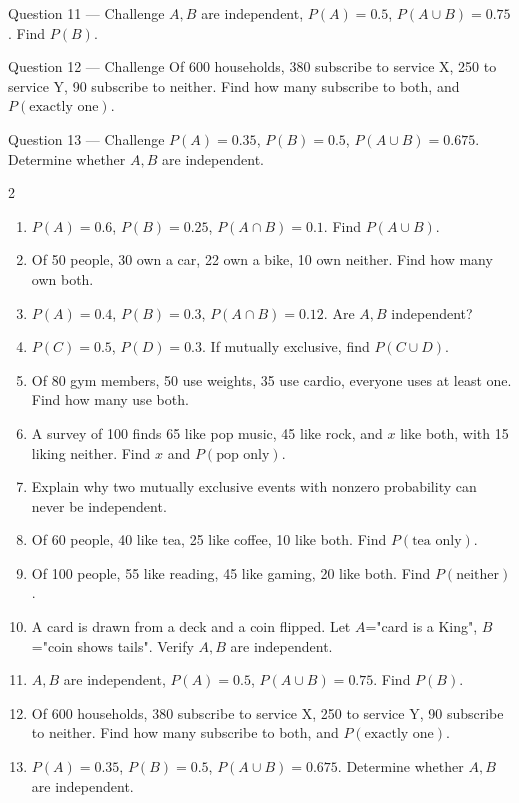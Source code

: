 \documentclass[11pt]{article}
\begin{document}
\begin{qbox}{Question 11 --- Challenge}
$A,B$ are independent, $P(A)=0.5$, $P(A\cup B)=0.75$. Find $P(B)$.\workspace{3.2cm}
\end{qbox}

\begin{qbox}{Question 12 --- Challenge}
Of 600 households, 380 subscribe to service X, 250 to service Y, 90 subscribe to neither. Find how many subscribe to both, and $P(\text{exactly one})$.\workspace{3.4cm}
\end{qbox}

\begin{qbox}{Question 13 --- Challenge}
$P(A)=0.35$, $P(B)=0.5$, $P(A\cup B)=0.675$. Determine whether $A,B$ are independent.\workspace{3cm}
\end{qbox}

\clearpage
{}

\begin{recapbox}
\begin{multicols}{2}
\small
\begin{enumerate}[leftmargin=*,itemsep=3pt]
  \item $P(A)=0.6$, $P(B)=0.25$, $P(A\cap B)=0.1$. Find $P(A\cup B)$.
  \item Of 50 people, 30 own a car, 22 own a bike, 10 own neither. Find how many own both.
  \item $P(A)=0.4$, $P(B)=0.3$, $P(A\cap B)=0.12$. Are $A,B$ independent?
  \item $P(C)=0.5$, $P(D)=0.3$. If mutually exclusive, find $P(C\cup D)$.
  \item Of 80 gym members, 50 use weights, 35 use cardio, everyone uses at least one. Find how many use both.
  \item A survey of 100 finds 65 like pop music, 45 like rock, and $x$ like both, with 15 liking neither. Find $x$ and $P(\text{pop only})$.
  \item Explain why two mutually exclusive events with nonzero probability can never be independent.
  \item Of 60 people, 40 like tea, 25 like coffee, 10 like both. Find $P(\text{tea only})$.
  \item Of 100 people, 55 like reading, 45 like gaming, 20 like both. Find $P(\text{neither})$.
  \item A card is drawn from a deck and a coin flipped. Let $A$="card is a King", $B$="coin shows tails". Verify $A,B$ are independent.
  \item $A,B$ are independent, $P(A)=0.5$, $P(A\cup B)=0.75$. Find $P(B)$.
  \item Of 600 households, 380 subscribe to service X, 250 to service Y, 90 subscribe to neither. Find how many subscribe to both, and $P(\text{exactly one})$.
  \item $P(A)=0.35$, $P(B)=0.5$, $P(A\cup B)=0.675$. Determine whether $A,B$ are independent.
\end{enumerate}
\end{multicols}
\end{recapbox}
\end{document}
